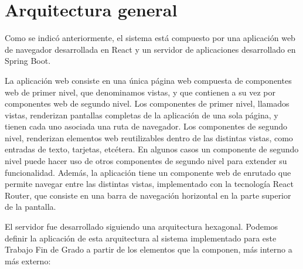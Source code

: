 \documentclass[a4paper, 12pt]{book}
\begin{document}
    \section{Arquitectura general}
    \label{sec:architecture_impl}

    Como se indicó anteriormente, el sistema está compuesto por una aplicación web de navegador desarrollada en React y un servidor de aplicaciones desarrollado en Spring Boot.

    La aplicación web consiste en una única página web compuesta de componentes web de primer nivel, que denominamos vistas, y que contienen a su vez por componentes web de segundo nivel.
    Los componentes de primer nivel, llamados vistas, renderizan pantallas completas de la aplicación de una sola página, y tienen cada uno asociada una ruta de navegador.
    Los componentes de segundo nivel, renderizan elementos web reutilizables dentro de las distintas vistas, como entradas de texto, tarjetas, etcétera. En algunos casos un componente de segundo nivel puede hacer uso de otros componentes de segundo nivel para extender su funcionalidad.
    Además, la aplicación tiene un componente web de enrutado que permite navegar entre las distintas vistas, implementado con la tecnología React Router, que consiste en una barra de navegación horizontal en la parte superior de la pantalla.

    El servidor fue desarrollado siguiendo una arquitectura hexagonal.
    Podemos definir la aplicación de esta arquitectura al sistema implementado para este Trabajo Fin de Grado a partir de los elementos que la componen, más interno a más externo:
\end{document}
